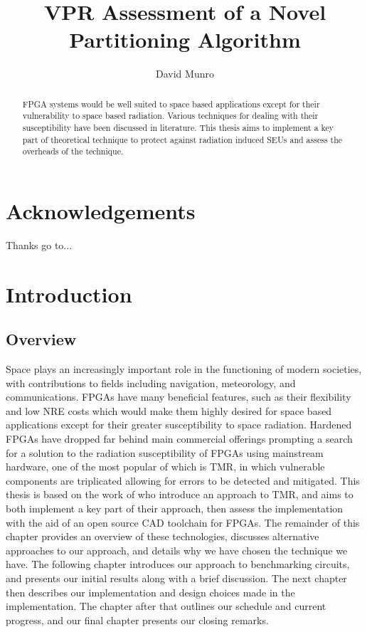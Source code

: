 \documentclass[12pt,drafta4paper,oneside]{memoir} %
\title{VPR Assessment of a Novel Partitioning Algorithm}
\author{David Munro}
\begin{document}
\maketitle
\begin{abstract}
	\ac{FPGA} systems would be well suited to space based applications except for their vulnerability to space based radiation. Various techniques for dealing with their susceptibility have been discussed in literature. This thesis aims to implement a key part of theoretical technique to protect against radiation induced \acp{SEU} and assess the overheads of the technique.
\acresetall
\end{abstract}
\chapter*{Acknowledgements}
Thanks go to...

\newpage

\tableofcontents*
\chapter{Introduction}
\section{Overview}
Space plays an increasingly important role in the functioning of modern societies, with contributions to fields including navigation, meteorology, and communications\cite{OECDSpace}. \acp{FPGA} have many beneficial features, such as their flexibility and low \ac{NRE} costs which would make them highly desired for space based applications except for their greater susceptibility to space radiation. Hardened \acp{FPGA} have dropped far behind main commercial offerings prompting a search for a solution to the radiation susceptibility of \acp{FPGA} using mainstream hardware\cite{VFPGATMR}, one of the most popular of which is \ac{TMR}, in which vulnerable components are triplicated allowing for errors to be detected and mitigated. This thesis is based on the work of\cite{DiesselChange} who introduce an approach to \ac{TMR}, and aims to both implement a key part of their approach, then assess the implementation with the aid of an open source \ac{CAD} toolchain for \acp{FPGA}.
The remainder of this chapter provides an overview of these technologies, discusses alternative approaches to our approach, and details why we have chosen the technique we have. The following chapter introduces our approach to benchmarking circuits, and presents our initial results along with a brief discussion. The next chapter then describes our implementation and design choices made in the implementation. The chapter after that outlines our schedule and current progress, and our final chapter presents our closing remarks.
\acresetall
\end{document}
